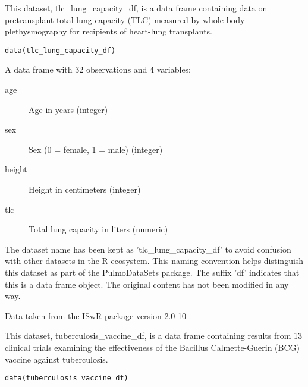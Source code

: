 \documentclass[a4paper]{book}
\begin{document}
%
\begin{Description}
This dataset, tlc\_lung\_capacity\_df, is a data frame containing data on pretransplant total
lung capacity (TLC) measured by whole-body plethysmography for recipients of heart-lung transplants.
\end{Description}
%
\begin{Usage}
\begin{verbatim}
data(tlc_lung_capacity_df)
\end{verbatim}
\end{Usage}
%
\begin{Format}
A data frame with 32 observations and 4 variables:
\begin{description}

\item[age] Age in years (integer)
\item[sex] Sex (0 = female, 1 = male) (integer)
\item[height] Height in centimeters (integer)
\item[tlc] Total lung capacity in liters (numeric)

\end{description}

\end{Format}
%
\begin{Details}
The dataset name has been kept as 'tlc\_lung\_capacity\_df' to avoid confusion
with other datasets in the R ecosystem. This naming convention helps distinguish
this dataset as part of the PulmoDataSets package. The suffix 'df' indicates
that this is a data frame object. The original content has not been modified
in any way.
\end{Details}
%
\begin{Source}
Data taken from the ISwR package version 2.0-10
\end{Source}
%
\begin{Description}
This dataset, tuberculosis\_vaccine\_df, is a data frame containing results from 13 clinical trials
examining the effectiveness of the Bacillus Calmette-Guerin (BCG) vaccine against tuberculosis.
\end{Description}
%
\begin{Usage}
\begin{verbatim}
data(tuberculosis_vaccine_df)
\end{verbatim}
\end{Usage}
\end{document}
